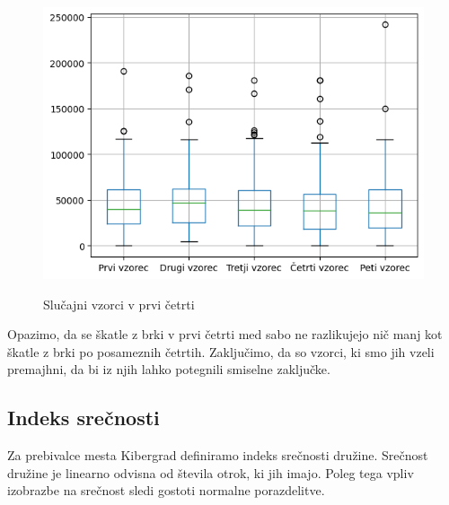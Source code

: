 \documentclass{article}
\begin{document}
\begin{figure}[H]
    \caption{Slučajni vzorci v prvi četrti}
    \centering
    \includegraphics[scale=0.8]{vzorci_severne_cetrti.png}
    \label{fig:slika2}
\end{figure}

Opazimo, da se škatle z brki v prvi četrti med sabo ne razlikujejo nič manj kot škatle z brki po posameznih četrtih. Zaključimo, da so vzorci, ki 
smo jih vzeli premajhni, da bi iz njih lahko potegnili smiselne zaključke. 



\subsection{Indeks srečnosti}

Za prebivalce mesta Kibergrad definiramo indeks srečnosti družine. Srečnost družine je linearno odvisna od števila otrok, ki jih imajo. Poleg tega vpliv 
izobrazbe na srečnost sledi gostoti normalne porazdelitve. 
\end{document}
